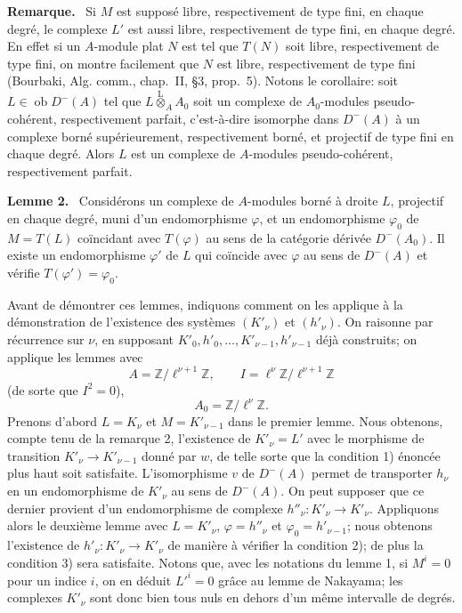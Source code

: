 \documentclass[11pt]{article}
\newenvironment{statement}[1]{\par\medskip\noindent\textbf{#1.}\ }{\par\medskip}
\providecommand{\lten}{\overset{\mathrm L}{\otimes}}
\providecommand{\Ob}{\operatorname{ob}}
\providecommand{\lten}{\overset{\mathrm L}{\otimes}}
\providecommand{\lten}{\overset{\mathrm L}{\otimes}}
\providecommand{\Ob}{\operatorname{ob}}
\providecommand{\lten}{\overset{\mathrm L}{\otimes}}
\providecommand{\lten}{\overset{\mathrm L}{\otimes}}
\providecommand{\Ob}{\operatorname{Ob}}
\providecommand{\lten}{\overset{\mathrm L}{\otimes}}
\providecommand{\Ob}{\operatorname{ob}}
\providecommand{\Ob}{\operatorname{Ob}}
\providecommand{\lten}{\overset{\mathrm L}{\otimes}}
\begin{document}
\begin{statement}{Remarque}
Si $M$ est supposé libre, respectivement de type fini, en chaque degré, le complexe $L'$ est aussi libre, respectivement de type fini, en chaque degré. En effet si un $A$-module plat $N$ est tel que $T(N)$ soit libre, respectivement de type fini, on montre facilement que $N$ est libre, respectivement de type fini (Bourbaki, Alg. comm., chap.~II, §3, prop.~5). Notons le corollaire: soit $L\in\Ob D^-(A)$ tel que $L\lten_A A_0$ soit un complexe de $A_0$-modules pseudo-cohérent, respectivement parfait, c'est-à-dire isomorphe dans $D^-(A)$ à un complexe borné supérieurement, respectivement borné, et projectif de type fini en chaque degré. Alors $L$ est un complexe de $A$-modules pseudo-cohérent, respectivement parfait.
\end{statement}

\begin{statement}{Lemme 2}
Considérons un complexe de $A$-modules borné à droite $L$, projectif en chaque degré, muni d'un endomorphisme $\varphi$, et un endomorphisme $\varphi_0$ de $M=T(L)$ coïncidant avec $T(\varphi)$ au sens de la catégorie dérivée $D^-(A_0)$. Il existe un endomorphisme $\varphi'$ de $L$ qui coïncide avec $\varphi$ au sens de $D^-(A)$ et vérifie $T(\varphi')=\varphi_0$.
\end{statement}

Avant de démontrer ces lemmes, indiquons comment on les applique à la démonstration de l'existence des systèmes $(K'_\nu)$ et $(h'_\nu)$. On raisonne par récurrence sur $\nu$, en supposant $K'_0,h'_0,\ldots,K'_{\nu-1},h'_{\nu-1}$ déjà construits; on applique les lemmes avec
\[
A=\mathbb Z/\ell^{\nu+1}\mathbb Z,
\qquad
I=\ell^\nu\mathbb Z/\ell^{\nu+1}\mathbb Z
\]
(de sorte que $I^2=0$),
\[
A_0=\mathbb Z/\ell^\nu\mathbb Z.
\]
Prenons d'abord $L=K_\nu$ et $M=K'_{\nu-1}$ dans le premier lemme. Nous obtenons, compte tenu de la remarque 2, l'existence de $K'_\nu=L'$ avec le morphisme de transition $K'_\nu\to K'_{\nu-1}$ donné par $w$, de telle sorte que la condition 1) énoncée plus haut soit satisfaite. L'isomorphisme $v$ de $D^-(A)$ permet de transporter $h_\nu$ en un endomorphisme de $K'_\nu$ au sens de $D^-(A)$. On peut supposer que ce dernier provient d'un endomorphisme de complexe $h''_\nu:K'_\nu\to K'_\nu$. Appliquons alors le deuxième lemme avec $L=K'_\nu$, $\varphi=h''_\nu$ et $\varphi_0=h'_{\nu-1}$; nous obtenons l'existence de $h'_\nu:K'_\nu\to K'_\nu$ de manière à vérifier la condition 2); de plus la condition 3) sera satisfaite. Notons que, avec les notations du lemme 1, si $M^i=0$ pour un indice $i$, on en déduit $L'^i=0$ grâce au lemme de Nakayama; les complexes $K'_\nu$ sont donc bien tous nuls en dehors d'un même intervalle de degrés.
\end{document}
